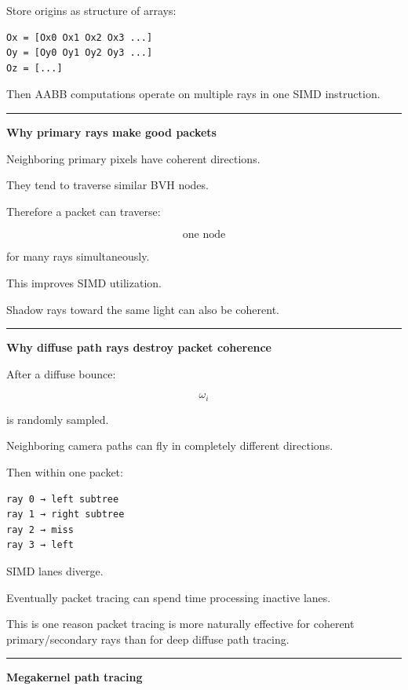 Store origins as structure of arrays:

\begin{verbatim}
Ox = [Ox0 Ox1 Ox2 Ox3 ...]
Oy = [Oy0 Oy1 Oy2 Oy3 ...]
Oz = [...]
\end{verbatim}

Then AABB computations operate on multiple rays in one SIMD instruction.

\begin{center}\rule{0.5\linewidth}{0.5pt}\end{center}

\textbf{Why primary rays make good packets}

Neighboring primary pixels have coherent directions.

They tend to traverse similar BVH nodes.

Therefore a packet can traverse:

\[
\text{one node}
\]

for many rays simultaneously.

This improves SIMD utilization.

Shadow rays toward the same light can also be coherent.

\begin{center}\rule{0.5\linewidth}{0.5pt}\end{center}

\textbf{Why diffuse path rays destroy packet coherence}

After a diffuse bounce:

\[
\omega_i
\]

is randomly sampled.

Neighboring camera paths can fly in completely different directions.

Then within one packet:

\begin{verbatim}
ray 0 → left subtree
ray 1 → right subtree
ray 2 → miss
ray 3 → left
\end{verbatim}

SIMD lanes diverge.

Eventually packet tracing can spend time processing inactive lanes.

This is one reason packet tracing is more naturally effective for coherent primary/secondary rays than for deep diffuse path tracing.

\begin{center}\rule{0.5\linewidth}{0.5pt}\end{center}

\textbf{Megakernel path tracing}

